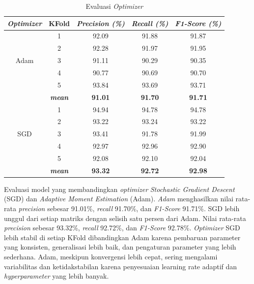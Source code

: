         \begin{table}[H]
        \centering
        \caption{Evaluasi \textit{Optimizer}}
        \begin{tabular}{ccccc}
            \toprule
            \textbf{\textit{Optimizer}} & \multicolumn{1}{c}{\textbf{KFold}} & \textbf{\textit{Precision (\%) } } & \textbf{\textit{Recall (\%)}} & \textbf{\textit{F1-Score (\%)}}\\
        
            \midrule
            \multirow{5}{*}{Adam} 
            & 1 & 92.09 & 91.88 & 91.87 \\
            & 2 & 92.28 & 91.97 & 91.95 \\
            & 3 & 91.11 & 90.29 & 90.35 \\
            & 4 & 90.77 & 90.69 & 90.70 \\
            & 5 & 93.84 & 93.69 & 93.71 \\ 
            & \textit{\textbf{mean}}& \textbf{91.01} & \textbf{91.70} &\textbf{91.71} \\ 
            \hline

    
            \multirow{5}{*}{SGD}
            & 1 & 94.94 & 94.78 & 94.78 \\
            & 2 & 93.22 & 93.24 & 93.22 \\
            & 3 & 93.41 & 91.78 & 91.99 \\
            & 4 & 92.97 & 92.96 & 92.90 \\
            & 5 & 92.08 & 92.10 & 92.04  \\
            & \textit{\textbf{mean}}& \textbf{93.32} & \textbf{92.72} &\textbf{92.98} \\ 
    

            \bottomrule
        \end{tabular}
        \label{Evaluasi Optimizer}
    \end{table}

    Evaluasi model yang membandingkan \textit{optimizer} \textit{Stochastic Gradient Descent} (SGD) dan
     \textit{Adaptive Moment Estimation} (Adam).  \textit{Adam} menghasilkan nilai rata-rata \textit{precision} 
     sebesar 91.01\%, \textit{recall} 91.70\%, dan\textit{ F1-Score} 91.71\%. SGD lebih unggul dari setiap 
     matriks dengan selisih satu persen dari Adam. Nilai rata-rata \textit{precision} sebesar 93.32\%, 
     \textit{recall} 92.72\%, dan\textit{ F1-Score} 92.78\%. \textit{Optimizer} SGD lebih stabil di setiap KFold dibandingkan Adam karena pembaruan parameter yang konsisten, 
     generalisasi lebih baik, dan pengaturan parameter yang lebih sederhana. Adam, meskipun konvergensi lebih cepat, 
     sering mengalami variabilitas dan ketidakstabilan karena penyesuaian learning rate adaptif dan
      \textit{hyperparameter} yang lebih banyak.

